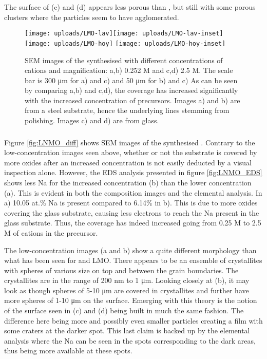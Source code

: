 \documentclass[Main/main.tex]{subfiles}
\begin{document}
The surface of (c) and (d) appears less porous than , but still with some porous clusters where the particles seem to have agglomerated.

\begin{figure}[ht]
    \centering
	\texttt{[image: uploads/LMO-lav]}\texttt{[image: uploads/LMO-lav-inset]} \\
	\texttt{[image: uploads/LMO-hoy]} \texttt{[image: uploads/LMO-hoy-inset]}
	\caption{SEM images of the synthesised  with different concentrations of cations and magnification: a,b) 0.252 M and c,d) 2.5 M. The scale bar is 300 \si{\micro m} for a) and c) and 50 \si{\micro m} for b) and c) As can be seen by comparing a,b) and c,d), the coverage has increased significantly with the increased concentration of precursors. Images a) and b) are from a steel substrate, hence the underlying lines stemming from polishing. Images c) and d) are from glass.}
	\label{fig:LMO_diff}
\end{figure}


\FloatBarrier
\subsubsection{}
Figure \ref{fig:LNMO_diff} shows SEM images of the synthesised . Contrary to the low-concentration images seen above, whether or not the substrate is covered by more oxides after an increased concentration is not easily deducted by a visual inspection alone. However, the EDS analysis presented in figure  \ref{fig:LNMO_EDS} shows less Na for the increased concentration (b) than the lower concentration (a). This is evident in both the composition images and the elemental analysis. In a) 10.05 at.\% Na is present compared to 6.14\% in b). This is due to more oxides covering the glass substrate, causing less electrons to reach the Na present in the glass substrate. Thus, the coverage has indeed increased going from 0.25 M to 2.5 M of cations in the precursor.

The low-concentration images (a and b) show a quite different morphology than what has been seen for  and LMO. There appears to be an ensemble of crystallites with spheres of various size on top and between the grain boundaries. The crystallites are in the range of 200 \si{nm} to 1 \si{\micro m}. Looking closely at (b), it may look as though spheres of 5-10 \si{\micro m} are covered in crystallites and further have more spheres of 1-10 \si{\micro m} on the surface. 
Emerging with this theory is the notion of the surface seen in (c) and (d) being built in much the same fashion. The difference here being more and possibly even smaller particles creating a film with some craters at the darker spot. This last claim is backed up by the elemental analysis where the Na can be seen in the spots corresponding to the dark areas, thus being more available at these spots. 
\end{document}
